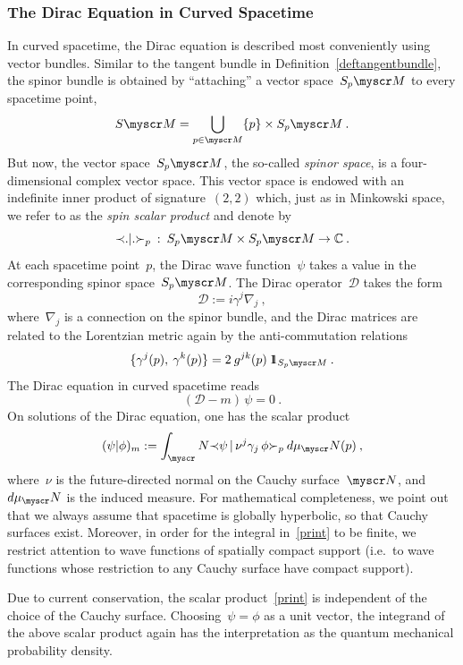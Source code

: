 \documentclass[reqno,11pt]{amsart}
\numberwithin{equation}{section}
\newtheorem{Def}{Definition}[section]
\newcommand{\beq}{\begin{equation}}
\newcommand{\eeq}{\end{equation}}
\newcommand{\Sl}{\mathopen{\prec}}
\newcommand{\Sr}{\mathclose{\succ}}
\newcommand{\C}{\mathbb{C}}
\newcommand{\1}{\mbox{\rm 1 \hspace{-1.05 em} 1}}
\renewcommand{\H}{\mathscr{H}}
\newcommand{\Dir}{{\mathcal{D}}}
\newcommand{\scrM}{\myscr M}
\newcommand{\scrN}{\myscr N}
\begin{document}
\subsubsection{The Dirac Equation in Curved Spacetime}
In curved spacetime, the Dirac equation is described most conveniently
using vector bundles. Similar to the tangent bundle in Definition~\ref{deftangentbundle},
the spinor bundle is obtained by ``attaching'' a vector space~$S_p\scrM$ to every spacetime point,
\[ S\scrM = \bigcup\limits_{p\in\scrM}\{p\}\times S_p\scrM \:. \]
But now, the vector space~$S_p\scrM$, the so-called {\em{spinor space}}, is a four-dimensional
complex vector space. This vector space is endowed with an indefinite inner product of signature~$(2,2)$
which, just as in Minkowski space, we refer to as the {\em{spin scalar product}} and denote by
\[ \Sl .|. \Sr_p \::\: S_p\scrM \times S_p\scrM \rightarrow \C \:. \]
At each spacetime point~$p$, the Dirac wave function~$\psi$ takes
a value in the corresponding spinor space~$S_p\scrM$.
The Dirac operator~$\Dir$ takes the form
\[ \Dir := i \gamma^j \nabla_j \:, \]
where~$\nabla_j$ is a connection on the spinor bundle, and the Dirac matrices are
related to the Lorentzian metric again by the anti-commutation relations
\[ \{ \gamma^j(p),\: \gamma^k(p) \} = 2\: g^{jk}(p)\:\1_{S_p\scrM} \:. \]
The Dirac equation in curved spacetime reads
\[ %
(\Dir - m) \,\psi = 0 \:. \]
On solutions of the Dirac equation, one has the scalar product
\beq \label{print}
(\psi | \phi)_m := \int_\scrN \Sl \psi \,|\, \nu^j \gamma_j\, \phi \Sr_p\: d\mu_\scrN(p) \:,
\eeq
where~$\nu$ is the future-directed normal on the Cauchy surface~$\scrN$,
and~$d\mu_\scrN$ is the induced measure.
For mathematical completeness, we point out that 
we always assume that spacetime is globally hyperbolic, so that Cauchy
surfaces exist. Moreover, in order for the integral in~\eqref{print} to be finite,
we restrict attention to wave functions of spatially compact support
(i.e.\ to wave functions whose restriction to any Cauchy surface have compact support).

Due to current conservation,
the scalar product~\eqref{print} is independent of the choice of the Cauchy surface.
Choosing~$\psi=\phi$ as a unit vector,
the integrand of the above scalar product again has
the interpretation as the quantum mechanical probability density.

%
%
%
%
%
%
\end{document}
